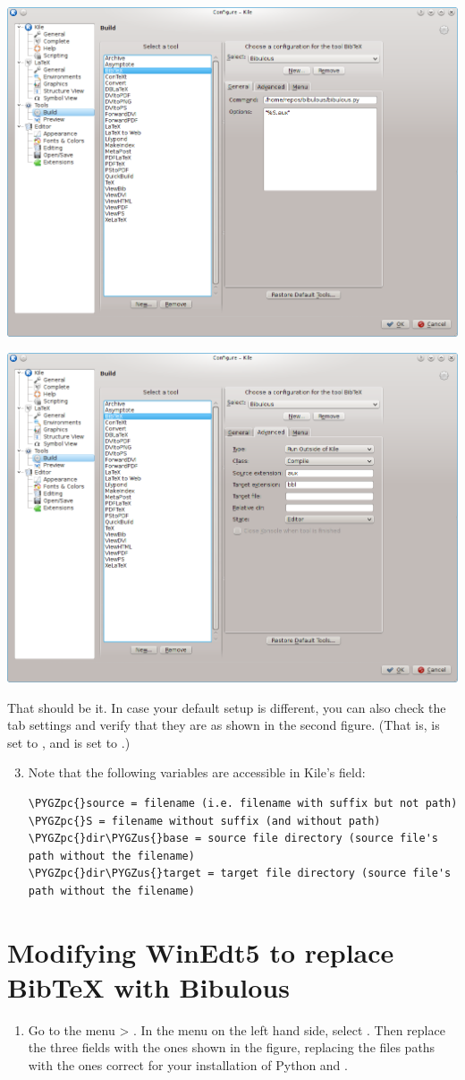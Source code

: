 \documentclass[letterpaper,10pt,english]{sphinxmanual}
\def\PYGZus{\char`\_}
\def\PYGZpc{\char`\%}
\begin{document}
\includegraphics[width=0.490\linewidth]{screenshot_for_kile_instructions.png}

\includegraphics[width=0.490\linewidth]{screenshot_for_kile_instructions2.png}

That should be it. In case your default setup is different, you can also check the  tab settings and verify that they are as shown in the second figure. (That is,  is set to , and  is set to .)
\begin{enumerate}
\setcounter{enumi}{2}
\item {} 
Note that the following variables are accessible in Kile's  field:

\begin{Verbatim}[commandchars=\\\{\}]
\PYGZpc{}source = filename (i.e. filename with suffix but not path)
\PYGZpc{}S = filename without suffix (and without path)
\PYGZpc{}dir\PYGZus{}base = source file directory (source file's path without the filename)
\PYGZpc{}dir\PYGZus{}target = target file directory (source file's path without the filename)
\end{Verbatim}

\end{enumerate}


\section{Modifying WinEdt5 to replace BibTeX with Bibulous}
\label{getting_started:modifying-winedt5-to-replace-bibtex-with-bibulous}\begin{enumerate}
\item {} 
Go to the menu  \textgreater{} . In the  menu on the left hand side, select . Then replace the three  fields with the ones shown in the figure, replacing the files paths with the ones correct for your installation of Python and .

\end{enumerate}
\end{document}

